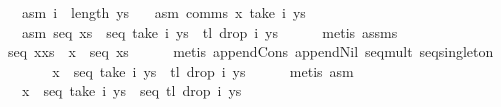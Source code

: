 \begin{isabellebody}
\ \ \ asm{}{}\ {}i\ {}\ length\ ys{}\isanewline
\ \ \ asm{}{}\ {}comms\ x\ {}take\ i\ ys{}{}\isanewline
\ \ \ asm{}{}\ {}seq\ xs\ {}\ seq\ {}take\ i\ ys\ {}\ tl\ {}drop\ i\ ys{}{}{}\isanewline
\ \ \ \ \isamarkupfalse%
\ {}metis\ assms{}\isanewline
\isanewline
\ \ \isamarkupfalse%
\ {}seq\ {}x{}xs{}\ {}\ x\ {}\ seq\ xs{}\isanewline
\ \ \ \ \isamarkupfalse%
\ {}metis\ append{}Cons\ append{}Nil\ seq{}mult\ seq{}singleton{}\isanewline
\ \ \isamarkupfalse%
\ \isamarkupfalse%
\ {}{}{}{}\ {}\ x\ {}\ seq\ {}take\ i\ ys\ {}\ tl\ {}drop\ i\ ys{}{}{}\isanewline
\ \ \ \ \isamarkupfalse%
\ {}metis\ asm{}{}\isanewline
\ \ \isamarkupfalse%
\ \isamarkupfalse%
\ {}{}{}{}\ {}\ x\ {}\ seq\ {}take\ i\ ys{}\ {}\ seq\ {}tl\ {}drop\ i\ ys{}{}{}\isanewline

\end{isabellebody}
